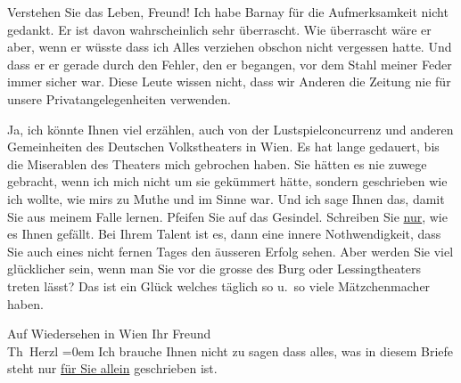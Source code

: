 \pstart
           Verstehen Sie das Leben, Freund! Ich habe Barnay für die Aufmerksamkeit nicht gedankt. Er ist davon wahrscheinlich
               sehr überrascht. Wie überrascht wäre er aber, wenn er wüsste dass ich Alles verziehen
                   obschon nicht vergessen hatte. Und dass er er
               gerade durch den Fehler, den er begangen, vor dem Stahl meiner Feder immer sicher
               war. Diese Leute wissen nicht, dass wir Anderen die Zeitung nie für unsere
               Privatangelegenheiten verwenden.\pend
           
\pstart
           Ja, ich könnte Ihnen viel erzählen, auch von der Lustspielconcurrenz und anderen
               Gemeinheiten des Deutschen Volkstheaters in Wien.  Es hat lange gedauert, bis die Miserablen des {\pb}Theaters mich gebrochen haben. Sie hätten
               es nie zuwege gebracht, wenn ich mich nicht um sie gekümmert hätte, sondern
               geschrieben wie ich wollte, wie mirs zu Muthe und im Sinne war. Und ich sage Ihnen
               das, damit Sie aus meinem Falle lernen. Pfeifen Sie auf das Gesindel. Schreiben Sie
                  \uline{nur}, wie es Ihnen gefällt. Bei Ihrem Talent ist
               es, dann eine innere Nothwendigkeit, dass Sie auch eines nicht fernen Tages den
               äusseren Erfolg sehen. Aber werden Sie viel glücklicher sein, wenn man Sie  vor die grosse \label{K_L03830-16v}\label{K_L03830-16} des Burg oder Lessingtheaters treten lässt? Das ist ein Glück welches täglich so u. so
               viele Mätzchenmacher haben.\pend
           
\pstart
           Auf Wiedersehen in Wien Ihr Freund{\\[\baselineskip]}\spacefill\mbox{Th Herzl}\pend
           \leftskip=0em{}
\pstart
           \noindent{}Ich brauche Ihnen nicht zu sagen dass alles, was in diesem Briefe steht nur \uline{für Sie allein} geschrieben ist.\pend
           \endnumbering{}
\begin{anhang}
\end{anhang}
      